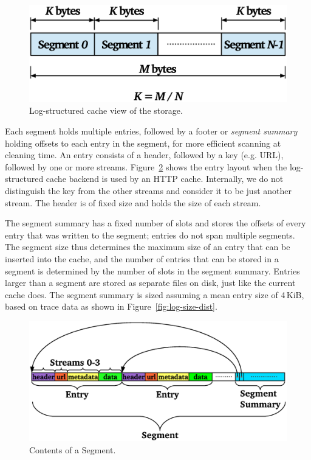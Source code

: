 \documentclass{sig-alternate}
\begin{document}
\begin{figure}[t]
  \begin{center}
    \includegraphics[width=1.04\columnwidth]{graphs/storage}
  \end{center}
  \caption{Log-structured cache view of the storage.}
  \label{fig:storage} 
\end{figure}

Each segment holds multiple entries, followed by a footer or \emph{segment
  summary} holding offsets to each entry in the segment, for more efficient
scanning at cleaning time.  An entry consists of a header, followed by a key
(e.g. URL), followed by one or more streams. Figure~\ref{fig:segment} shows the
entry layout when the log-structured cache backend is used by an HTTP cache.
Internally, we do not distinguish the key from the other streams and consider it
to be just another stream.  The header is of fixed size and holds the size of
each stream.

The segment summary has a fixed number of slots and stores the offsets of every
entry that was written to the segment; entries do not span multiple segments.
The segment size thus determines the maximum size of an entry that can be
inserted into the cache, and the number of entries that can be stored in a
segment is determined by the number of slots in the segment summary.  Entries
larger than a segment are stored as separate files on disk, just like the
current cache does.  The segment summary is sized assuming a mean entry size of
4\,KiB, based on trace data as shown in Figure~\ref{fig:log-size-dist}.

\begin{figure}[t]
  \begin{center}
    \includegraphics[width=1.04\columnwidth]{graphs/segment}
  \end{center}
  \caption{Contents of a Segment.}
  \label{fig:segment} 
\end{figure}
\end{document}

